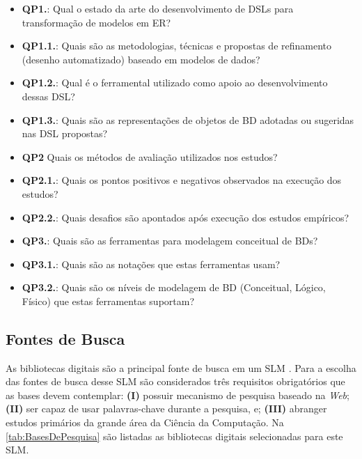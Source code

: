 \begin{itemize}
    \small
    \item \textbf{QP1.}: Qual o estado da arte do desenvolvimento de DSLs para transformação de modelos em ER?
    \item \textbf{QP1.1.}: Quais são as metodologias, técnicas e propostas de refinamento (desenho automatizado) baseado em modelos de dados?
    \item \textbf{QP1.2.}: Qual é o ferramental utilizado como apoio ao desenvolvimento dessas DSL?
    \item \textbf{QP1.3.}: Quais são as representações de objetos de \ac{BD} adotadas ou sugeridas nas DSL propostas?
    \item \textbf{QP2} Quais os métodos de avaliação utilizados nos estudos?
    \item \textbf{QP2.1.}: Quais os pontos positivos e negativos observados na execução dos estudos?
    \item \textbf{QP2.2.}: Quais desafios são apontados após execução dos estudos empíricos?
    \item \textbf{QP3.}: Quais são as ferramentas para modelagem conceitual de \acp{BD}? 
    \item \textbf{QP3.1.}: Quais são as notações que estas ferramentas usam?
    \item \textbf{QP3.2.}: Quais são os níveis de modelagem de \ac{BD} (Conceitual, Lógico, Físico) que estas ferramentas suportam?
\end{itemize}

    \subsection{Fontes de Busca} \label{ssec:FontesBuscas}

As bibliotecas digitais são a principal fonte de busca em um \ac{SLM} \cite{Petersen:2008}. 
Para a escolha das fontes de busca desse \ac{SLM} são considerados três requisitos obrigatórios que as bases devem contemplar: 
\textbf{(I)} possuir mecanismo de pesquisa baseado na \textit{Web}; 
\textbf{(II)} ser capaz de usar palavras-chave durante a pesquisa, e;
\textbf{(III)} abranger estudos primários da grande área da Ciência da Computação. 
Na \autoref{tab:BasesDePesquisa} são listadas as bibliotecas digitais selecionadas para este \ac{SLM}.
        
